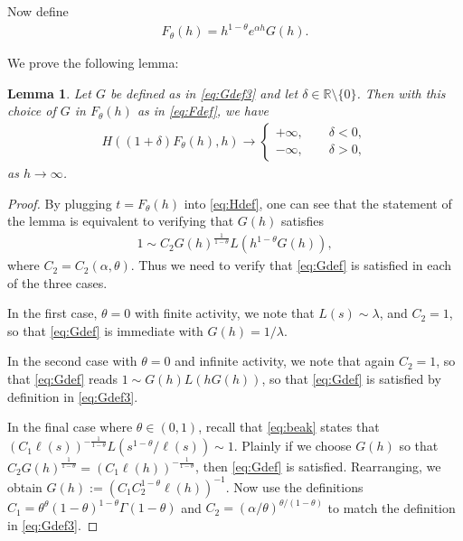 \documentclass[a4,12pt]{amsart}
\numberwithin{equation}{section}
\newtheorem{lemma}[thm]{Lemma}
\begin{document}
    Now define
    \begin{align} \label{eq:Fdef}
    F_\theta(h) = h^{1-\theta}e^{\alpha h} G(h).
    \end{align}
    
    We prove the following lemma:
    
    
    \begin{lemma} \label{lem:Gcheck}
    Let $G$ be defined as in \eqref{eq:Gdef3} and let $\delta \in \mathbb{R}\setminus\{0\}$. Then with this choice of $G$ in $F_\theta(h)$ as in \eqref{eq:Fdef}, we have 
    \begin{align} \label{eq:eitheror}
    H((1+\delta)F_\theta(h), h) \to \begin{cases}
        +\infty, \qquad \text{$\delta < 0$},\\
        -\infty, \qquad \text{$\delta > 0$},
    \end{cases}
    \end{align}
    as $h\rightarrow\infty$.
    \end{lemma}
    \begin{proof}
    By plugging $t=F_\theta(h)$ into \eqref{eq:Hdef}, one can see that the statement of the lemma is equivalent to verifying that $G(h)$ satisfies 
    \begin{align} \label{eq:Gdef}
    1 \sim C_2 G(h)^{\frac{1}{1-\theta}} L(h^{1-\theta}G(h)),
    \end{align}
    where $C_2 = C_2(\alpha,\theta)$. Thus we need to verify that \eqref{eq:Gdef} is satisfied in each of the three cases.
    
    In the first case, $\theta = 0$ with finite activity, we note that $L(s) \sim \lambda$, and $C_2 = 1$, so that \eqref{eq:Gdef} is immediate with $G(h) = 1/\lambda$. 
    
    In the second case with $\theta = 0$ and infinite activity, we note that again $C_2 = 1$, so that \eqref{eq:Gdef} reads $1 \sim G(h)L(hG(h))$, so that \eqref{eq:Gdef} is satisfied by definition in \eqref{eq:Gdef3}. 
    
    In the final case where $\theta \in (0,1)$, recall that \eqref{eq:beak} states that $(C_1\ell(s))^{-\frac{1}{1-\theta}} L \left( s^{1-\theta}/\ell(s) \right) \sim 1$. Plainly if we choose $G(h)$ so that $C_2G(h)^{\frac{1}{1-\theta}} = (C_1\ell(h))^{- \frac{1}{1-\theta}}$, then \eqref{eq:Gdef} is satisfied. Rearranging, we obtain $G(h) := \left( C_1C_2^{1-\theta}\ell(h) \right)^{-1}$. Now use the definitions $C_1 = \theta^\theta(1-\theta)^{1-\theta}\Gamma(1-\theta)$ and $C_2 = (\alpha/\theta)^{\theta/(1-\theta)}$ to match the definition in \eqref{eq:Gdef3}. 
    \end{proof}
\end{document}
